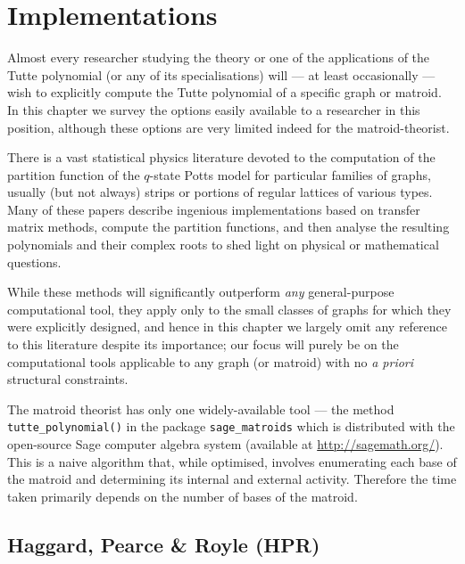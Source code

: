 \section{Implementations}  
\label{implementations}

Almost every researcher studying the theory or one of the applications of the Tutte polynomial (or any of its specialisations) will --- at least occasionally --- wish to explicitly compute the Tutte polynomial of a specific graph or matroid. In this chapter we survey the options easily
available to a researcher in this position, although these options are very limited indeed for the matroid-theorist.

There is a vast statistical physics literature devoted to the computation of the partition function of the $q$-state Potts model for particular
families of graphs, usually (but not always) strips or portions of regular lattices of various types. Many of these papers describe ingenious implementations based on transfer matrix methods, compute the partition functions, and then analyse the resulting polynomials and their complex roots to shed light on physical or mathematical questions. 

While these methods will significantly outperform {\em any} general-purpose computational tool, they apply only to the small classes of graphs
for which they were explicitly designed, and hence in this chapter we largely omit any reference to this literature despite its importance; our focus
will purely be on the computational tools applicable to any graph (or matroid) with no {\em a priori} structural constraints.

The matroid theorist has only one widely-available tool --- the method \verb+tutte_polynomial()+ in the package \verb+sage_matroids+
which is distributed with the open-source Sage computer algebra system (available at \url{http://sagemath.org/}).  This is a naive algorithm that, while optimised, involves enumerating each base of the matroid and determining its internal and external activity. Therefore the time taken primarily depends on the number of bases of the matroid.

%
%

\subsection{Haggard, Pearce \& Royle (HPR)}


